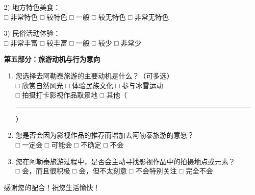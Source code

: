 \documentclass[10pt]{article}
\newcommand{\fillline}{\rule{2.5cm}{0.4pt}}
\begin{document}
\begin{CJK*}{UTF8}{gbsn}
\begin{enumerate}[label=\arabic*., resume, itemsep=0.8cm]
2) 地方特色美食：\\
□ 非常特色 \hspace{1cm} □ 较特色 \hspace{1cm} □ 一般 \hspace{1cm} □ 较无特色 \hspace{1cm} □ 非常无特色

3) 民俗活动体验：\\
□ 非常丰富 \hspace{1cm} □ 较丰富 \hspace{1cm} □ 一般 \hspace{1cm} □ 较少 \hspace{1cm} □ 非常少
\end{enumerate}

\vspace{0.5cm}
\textbf{第五部分：旅游动机与行为意向}

\begin{enumerate}[label=\arabic*., resume, itemsep=0.8cm]
\item 您选择去阿勒泰旅游的主要动机是什么？（可多选）\\
□ 欣赏自然风光 \hspace{2cm} □ 体验民族文化 \hspace{2cm} □ 参与冰雪运动\\
□ 拍摄打卡影视作品取景地 \hspace{2cm} □ 其他（\fillline）

\item 您是否会因为影视作品的推荐而增加去阿勒泰旅游的意愿？\\
□ 一定会 \hspace{1cm} □ 可能会 \hspace{1cm} □ 不确定 \hspace{1cm} □ 不会

\item 您在阿勒泰旅游过程中，是否会主动寻找影视作品中的拍摄地点或元素？\\
□ 会，而且很积极 \hspace{1cm} □ 会，但不太刻意 \hspace{1cm} □ 不会特别关注 \hspace{1cm} □ 完全不会
\end{enumerate}

\vspace{0.8cm}
\begin{center}
感谢您的配合！祝您生活愉快！
\end{center}

\end{CJK*}
\end{document}
